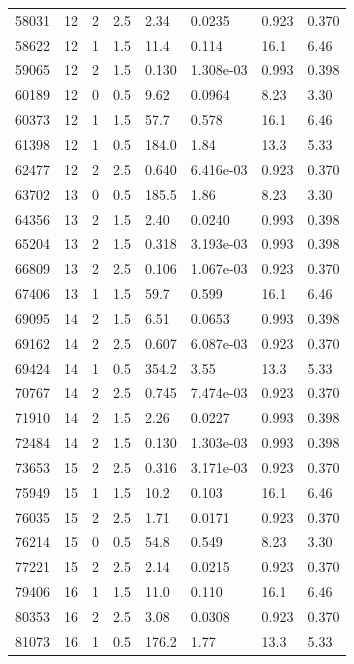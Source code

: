 \documentclass[preview]{standalone}
\begin{document}
{{{\begin{tabular}{L{1.2cm}C{1.2cm} C{0.3cm}C{0.5cm} C{1.4cm}C{1.4cm} C{1.4cm}C{1.4cm}}
  58031  &    12  & 2     & 2.5 &  2.34  & 0.0235  & 0.923 &  0.370   \\ 
  58622  &    12  & 1     & 1.5 &  11.4  & 0.114  & 16.1 &  6.46   \\ 
  59065  &    12  & 2     & 1.5 &  0.130  & 1.308e-03  & 0.993 &  0.398   \\ 
  60189  &    12  & 0     & 0.5 &  9.62  & 0.0964  & 8.23 &  3.30   \\ 
  60373  &    12  & 1     & 1.5 &  57.7  & 0.578  & 16.1 &  6.46   \\ 
  61398  &    12  & 1     & 0.5 &  184.0  & 1.84  & 13.3 &  5.33   \\ 
  62477  &    12  & 2     & 2.5 &  0.640  & 6.416e-03  & 0.923 &  0.370   \\ 
  63702  &    13  & 0     & 0.5 &  185.5  & 1.86  & 8.23 &  3.30   \\ 
  64356  &    13  & 2     & 1.5 &  2.40  & 0.0240  & 0.993 &  0.398   \\ 
  65204  &    13  & 2     & 1.5 &  0.318  & 3.193e-03  & 0.993 &  0.398   \\ 
  66809  &    13  & 2     & 2.5 &  0.106  & 1.067e-03  & 0.923 &  0.370   \\ 
  67406  &    13  & 1     & 1.5 &  59.7  & 0.599  & 16.1 &  6.46   \\ 
  69095  &    14  & 2     & 1.5 &  6.51  & 0.0653  & 0.993 &  0.398   \\ 
  69162  &    14  & 2     & 2.5 &  0.607  & 6.087e-03  & 0.923 &  0.370   \\ 
  69424  &    14  & 1     & 0.5 &  354.2  & 3.55  & 13.3 &  5.33   \\ 
  70767  &    14  & 2     & 2.5 &  0.745  & 7.474e-03  & 0.923 &  0.370   \\ 
  71910  &    14  & 2     & 1.5 &  2.26  & 0.0227  & 0.993 &  0.398   \\ 
  72484  &    14  & 2     & 1.5 &  0.130  & 1.303e-03  & 0.993 &  0.398   \\ 
  73653  &    15  & 2     & 2.5 &  0.316  & 3.171e-03  & 0.923 &  0.370   \\ 
  75949  &    15  & 1     & 1.5 &  10.2  & 0.103  & 16.1 &  6.46   \\ 
  76035  &    15  & 2     & 2.5 &  1.71  & 0.0171  & 0.923 &  0.370   \\ 
  76214  &    15  & 0     & 0.5 &  54.8  & 0.549  & 8.23 &  3.30   \\ 
  77221  &    15  & 2     & 2.5 &  2.14  & 0.0215  & 0.923 &  0.370   \\ 
  79406  &    16  & 1     & 1.5 &  11.0  & 0.110  & 16.1 &  6.46   \\ 
  80353  &    16  & 2     & 2.5 &  3.08  & 0.0308  & 0.923 &  0.370   \\ 
  81073  &    16  & 1     & 0.5 &  176.2  & 1.77  & 13.3 &  5.33   \\ 
\hline 
\end{tabular} 

}}}
\end{document}
